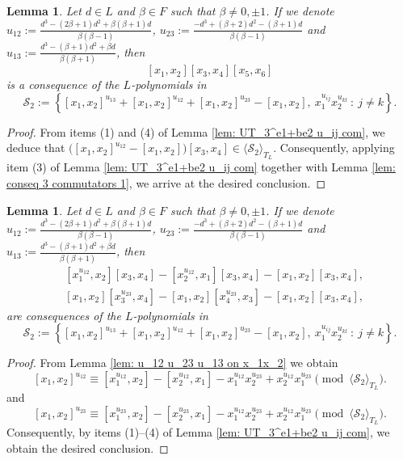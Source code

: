 \documentclass[a4paper,reqno]{amsart}
\newtheorem{lemma}[theorem]{Lemma}
\theoremstyle{definition}
\numberwithin{equation}{section}
\numberwithin{theorem}{section}
\begin{document}
\begin{lemma}\label{lem: UT_3^e1+be2 3comm}
      Let $d\in L$ and $\beta\in F$ such that $\beta\neq 0, \pm 1$. If we denote $u_{12}:=\frac{d^3- (2\beta+1)d^2+\beta(\beta+1)d}{\beta(\beta-1)}$, $u_{23}:=\frac{-d^3+(\beta+2)d^2-(\beta+1)d}{\beta(\beta-1)}$ and $u_{13}:=\frac{d^3-(\beta+1)d^2+\beta d}{\beta(\beta+1)}$, then
      $$[x_1,x_2][x_3,x_4][x_5,x_6]$$
      is a consequence of the $L$-polynomials in
      $$\mathcal{S}_2:=\left\{ [x_1,x_2]^{u_{13}}+ [x_1,x_2]^{u_{12}} + [x_1,x_2]^{u_{23}} - [x_1,x_2],\ x_1^{u_{ij}}x_2^{u_{kl}}\ : \  j\neq k \right\}.$$
\end{lemma}
\begin{proof}
From items (1) and (4) of Lemma \ref{lem: UT_3^e1+be2 u_ij com}, we deduce that $\big([x_1,x_2]^{u_{12}}-[x_1,x_2]\big)[x_3,x_4]\in \langle \mathcal{S}_2\rangle_{T_L}$. Consequently, applying item (3) of Lemma \ref{lem: UT_3^e1+be2 u_ij com} together with Lemma \ref{lem: conseq 3 commutators 1}, we arrive at the desired conclusion.
\end{proof}



\begin{lemma}\label{lem: UT_3^e1+be2 u_12 u_23 ordering 1}
    Let $d\in L$ and $\beta\in F$ such that $\beta\neq 0, \pm 1$. If we denote $u_{12}:=\frac{d^3- (2\beta+1)d^2+\beta(\beta+1)d}{\beta(\beta-1)}$, $u_{23}:=\frac{-d^3+(\beta+2)d^2-(\beta+1)d}{\beta(\beta-1)}$ and $u_{13}:=\frac{d^3-(\beta+1)d^2+\beta d}{\beta(\beta+1)}$, then
    \begin{align*}
        &[x_1^{u_{12}},x_2] [x_3,x_4] - [x_2^{u_{12}},x_1] [x_3,x_4]-[x_1,x_2][x_3,x_4],\\
        & [x_1,x_2] [x_3^{u_{23}},x_4] - [x_1,x_2] [x_4^{u_{23}},x_3]-[x_1,x_2][x_3,x_4],
    \end{align*}
are consequences of the $L$-polynomials in
$$\mathcal{S}_2:=\left\{ [x_1,x_2]^{u_{13}}+ [x_1,x_2]^{u_{12}} + [x_1,x_2]^{u_{23}} - [x_1,x_2],\ x_1^{u_{ij}}x_2^{u_{kl}}\ : \ j\neq k \right\}.$$
\end{lemma}
\begin{proof}
    From Lemma \ref{lem: u_12 u_23 u_13 on x_1x_2} we obtain
$$
[x_1,x_2]^{u_{12}}\equiv [x_1^{u_{12}},x_2] - [x_2^{u_{12}},x_1]-x_1^{u_{12}} x_2^{u_{23}} + x_2^{u_{12}} x_1^{u_{23}} \pmod{\langle \mathcal{S}_2 \rangle_{T_L}}.
$$
and
$$
[x_1,x_2]^{u_{23}}\equiv [x_1^{u_{23}},x_2] - [x_2^{u_{23}},x_1]-x_1^{u_{12}} x_2^{u_{23}} + x_2^{u_{12}} x_1^{u_{23}} \pmod{\langle \mathcal{S}_2 \rangle_{T_L}}.
$$
Consequently, by items (1)--(4) of Lemma \ref{lem:  UT_3^e1+be2 u_ij com}, we obtain the desired conclusion.
\end{proof}
\end{document}

